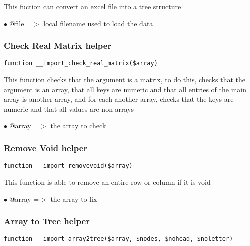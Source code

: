 \documentclass[a4paper]{article}
\begin{document}
This fuction can convert an excel file into a tree structure

\begin{compactitem}
\item[\color{myblue}$\bullet$] @file =$>$ local filename used to load the data
\end{compactitem}

\hypertarget{toc471}{}
\subsubsection{Check Real Matrix helper}

\begin{lstlisting}
function __import_check_real_matrix($array)
\end{lstlisting}

This function checks that the argument is a matrix, to do this, checks
that the argument is an array, that all keys are numeric and that all
entries of the main array is another array, and for each another array,
checks that the keys are numeric and that all values are non arrays

\begin{compactitem}
\item[\color{myblue}$\bullet$] @array =$>$ the array to check
\end{compactitem}

\hypertarget{toc472}{}
\subsubsection{Remove Void helper}

\begin{lstlisting}
function __import_removevoid($array)
\end{lstlisting}

This function is able to remove an entire row or column if it is void

\begin{compactitem}
\item[\color{myblue}$\bullet$] @array =$>$ the array to fix
\end{compactitem}

\hypertarget{toc473}{}
\subsubsection{Array to Tree helper}

\begin{lstlisting}
function __import_array2tree($array, $nodes, $nohead, $noletter)
\end{lstlisting}
\end{document}
